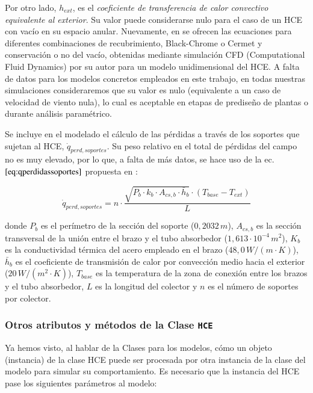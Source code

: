 Por otro lado,  \(h_{ext}\), es el \textit{coeficiente de transferencia de calor convectivo  equivalente al exterior}. Su valor puede considerarse nulo para el caso  de un HCE con vacío en su espacio anular. Nuevamente, en \cite{barberofresnoDesarrolloModeloTeorico2018} se ofrecen las ecuaciones para diferentes combinaciones de   recubrimiento, Black-Chrome o Cermet y conservación o no del vacío,   obtenidas mediante simulación CFD (Computational Fluid Dynamics) por su autor para un modelo unidimensional del HCE. A falta de datos para los modelos concretos empleados en este trabajo, en todas nuestras simulaciones consideraremos que su valor es nulo (equivalente a un caso de velocidad de viento nula), lo cual es aceptable en etapas de prediseño de plantas o durante análisis paramétrico.

Se incluye en el modelado el cálculo de las pérdidas a través de los soportes que sujetan al HCE, \(\dot q_{perd,soportes}\). Su peso relativo en el total de pérdidas del campo no es muy elevado, por lo que, a falta de más datos, se hace uso de la ec.\(\eqref{eq:qperdidassoportes}\)  propuesta en \cite{forristallHeatTransferAnalysis2003}:

\begin{equation}
   \dot q_{perd,soportes} =  n \cdot \frac{\sqrt{P_b \cdot k_b \cdot A_{cs,b} \cdot \bar h_b} \cdot (T_{base} - T_{ext})}{L}
    \label{eq:qperdidassoportes}
\end{equation}

donde \(P_b\) es el perímetro de la sección del soporte ($0,2032\,m$), \(A_{cs,b}\) es la sección transversal de la unión entre el brazo y el tubo absorbedor ($1,613\cdot 10^{-4}\,  m^2$), \(K_b\) es la conductividad térmica del acero empleado en el brazo ($48,0\,W/(m \cdot K)$), \(\bar h_b\) es el coeficiente de transmisión de calor por convección medio hacia el exterior ($20\, W/(m^2 \cdot K)$), \(T_{base}\) es la temperatura de la zona de conexión entre los brazos y el tubo absorbedor, \(L\) es la longitud del colector y \(n\) es el número de soportes por colector.

\subsubsection{Otros atributos y métodos de la Clase \texttt{HCE}}

Ya hemos visto, al hablar de la Clases para los modelos, cómo un objeto (instancia) de la clase HCE puede ser procesada por otra instancia de la clase del modelo para simular su comportamiento. Es necesario que la instancia del HCE pase los siguientes parámetros al modelo:

